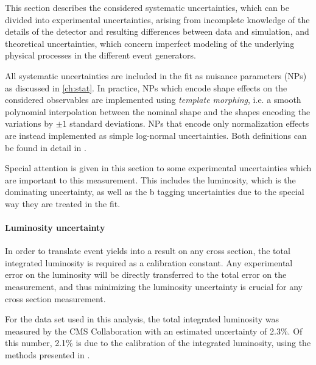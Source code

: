 This section describes the considered systematic uncertainties, which can be divided into experimental uncertainties, arising from incomplete knowledge of the details of the detector and resulting differences between data and simulation, and theoretical uncertainties, which concern imperfect modeling of the underlying physical processes in the different event generators. %

All systematic uncertainties are included in the fit as nuisance parameters (NPs) as discussed in \cref{ch:stat}. In practice, NPs which encode shape effects on the considered observables are implemented using \textit{template morphing}, i.e. a smooth polynomial interpolation between the nominal shape and the shapes encoding the variations by $\pm 1$ standard deviations. NPs that encode only normalization effects are instead implemented as simple log-normal uncertainties. Both definitions can be found in detail in .

Special attention is given in this section to some experimental uncertainties which are important to this measurement. This includes the luminosity, which is the dominating uncertainty, as well as 
the b tagging uncertainties due to the special way they are treated in the fit.

\paragraph{Luminosity uncertainty}

In order to translate event yields into a result on any cross section, the total integrated luminosity is required as a calibration constant. Any experimental error on the luminosity will be directly transferred to the total error on the measurement, and thus minimizing the luminosity uncertainty is crucial for any cross section measurement.

For the data set used in this analysis, the total integrated luminosity was measured by the CMS Collaboration with an estimated uncertainty of 2.3\%. Of this number, 2.1\% is due to the calibration of the integrated luminosity, using the methods presented in .%

